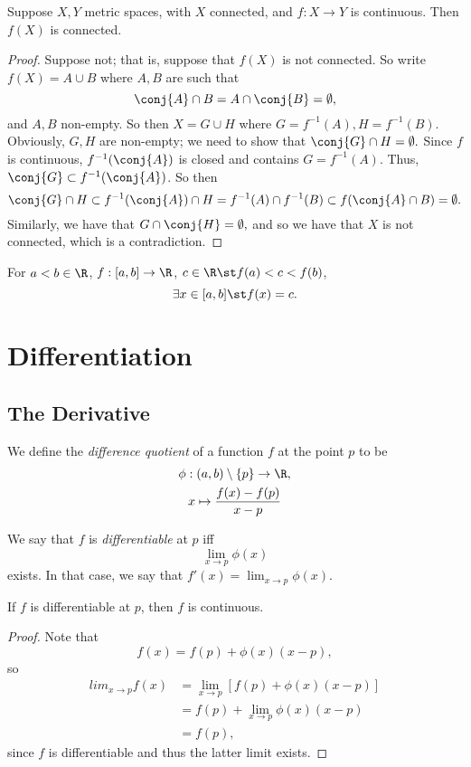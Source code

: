 \documentclass{notes}
\begin{document}
\begin{theorem}
  Suppose $X,Y$ metric spaces, with $X$ connected, and $f: X\to Y$ is continuous. Then $f(X)$ is
  connected.
\end{theorem}
\begin{proof}
  Suppose not; that is, suppose that $f(X)$ is not connected. So write $f(X) = A\cup B$ where $A,B$
  are such that $$\conj{A} \cap B = A \cap \conj{B} = \emptyset,$$ and $A,B$ non-empty. So then $X =
  G \cup H$ where $G = f^{-1}(A), H = f^{-1}(B)$. Obviously, $G,H$ are non-empty; we need to show
  that $\conj{G} \cap H = \emptyset.$ Since $f$ is continuous, $f^{-1}(\conj{A})$ is closed and
  contains $G = f^{-1}(A)$. Thus, $\conj{G} \subset f^{-1}(\conj{A})$. So then $$\conj{G} \cap H
  \subset f^{-1}(\conj{A}) \cap H = f^{-1}(A) \cap f^{-1}(B) \subset f(\conj{A} \cap B) =
  \emptyset.$$ Similarly, we have that $G\cap\conj{H} = \emptyset,$ and so we have that $X$ is not
  connected, which is a contradiction.
\end{proof}

\begin{corollary}
  For $a<b \in \R$, $f: [a,b] \to \R$, $c\in\R \st f(a) < c < f(b)$, $$\exists x\in [a,b] \st f(x) =
  c.$$
\end{corollary}

\section{Differentiation}
\subsection{The Derivative}

\begin{defn}
  We define the \emph{difference quotient} of a function $f$ at the point $p$ to be
  \begin{gather*}
    \phi: (a,b) \setminus \{p\} \to \R, \\
    x \mapsto \frac{f(x) - f(p)}{x - p}
  \end{gather*}
\end{defn}

\begin{defn}[Differentiability]
  We say that $f$ is \emph{differentiable} at $p$ iff $$\lim_{x\to p} \phi(x)$$ exists. In that case,
  we say that $f'(x) = \lim_{x\to p} \phi(x)$.
\end{defn}

\begin{theorem}
  If $f$ is differentiable at $p$, then $f$ is continuous.
\end{theorem}
\begin{proof}
  Note that $$f(x) = f(p) + \phi(x)(x-p),$$ so 
  \begin{align*}
    lim_{x\to p} f(x) &= \lim_{x\to p} \left[ f(p) + \phi(x)(x-p) \right] \\
                      &= f(p) + \lim_{x\to p} \phi(x)(x-p) \\
                      &= f(p),
  \end{align*}
  since $f$ is differentiable and thus the latter limit exists.
\end{proof}
\end{document}

